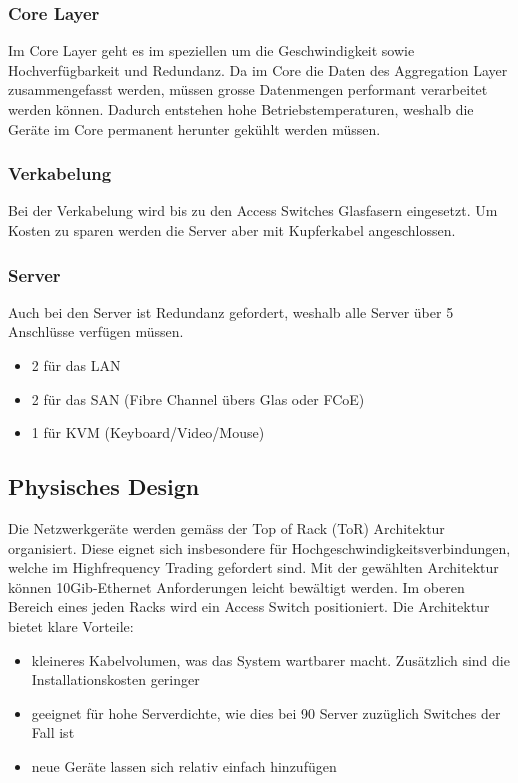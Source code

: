 \subsubsection{Core Layer}
Im Core Layer geht es im speziellen um die Geschwindigkeit sowie Hochverfügbarkeit und Redundanz. Da im Core die Daten des Aggregation Layer zusammengefasst werden, müssen grosse Datenmengen performant verarbeitet werden können. Dadurch entstehen hohe Betriebstemperaturen, weshalb die Geräte im Core permanent herunter gekühlt werden müssen.

\subsubsection{Verkabelung}
Bei der Verkabelung wird bis zu den Access Switches Glasfasern eingesetzt. Um Kosten zu sparen werden die Server aber mit Kupferkabel angeschlossen.

\subsubsection{Server}
Auch bei den Server ist Redundanz gefordert, weshalb alle Server über 5 Anschlüsse verfügen müssen. 
\begin{itemize}
	\item 2 für das LAN 
	\item 2 für das SAN (Fibre Channel übers Glas oder FCoE)
	\item 1 für KVM (Keyboard/Video/Mouse)
\end{itemize}

\subsection{Physisches Design}
Die Netzwerkgeräte werden gemäss der Top of Rack (ToR) Architektur organisiert. Diese eignet sich insbesondere für Hochgeschwindigkeitsverbindungen, welche im Highfrequency Trading gefordert sind. Mit der gewählten Architektur können 10Gib-Ethernet Anforderungen leicht bewältigt werden. Im oberen Bereich eines jeden Racks wird ein Access Switch positioniert. Die Architektur bietet klare Vorteile:
\begin{itemize}
	\item kleineres Kabelvolumen, was das System wartbarer macht. Zusätzlich sind die Installationskosten geringer
	\item geeignet für hohe Serverdichte, wie dies bei 90 Server zuzüglich Switches der Fall ist
	\item neue Geräte lassen sich relativ einfach hinzufügen
\end{itemize}

